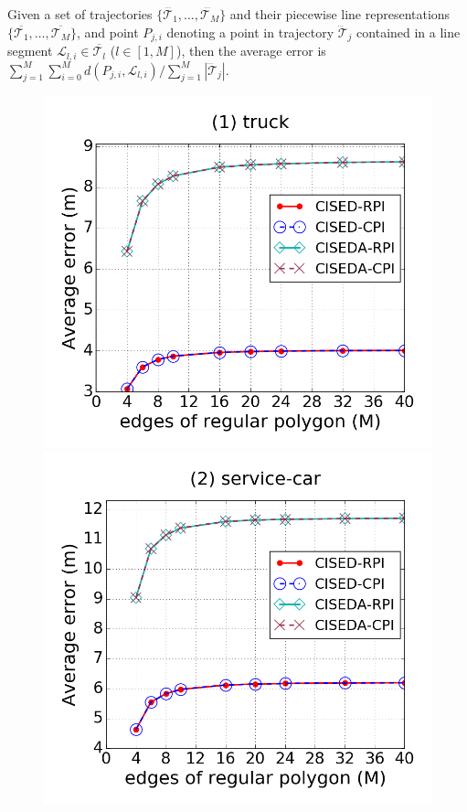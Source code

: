 Given a set of trajectories $\{\dddot{\mathcal{T}_1}, \ldots, \dddot{\mathcal{T}_M}\}$ and their piecewise line representations $\{\overline{\mathcal{T}_1}, \ldots, \overline{\mathcal{T}_M}\}$, and point $P_{j,i}$ denoting
a point in trajectory $\dddot{\mathcal{T}}_j$ contained in a line segment $\mathcal{L}_{l,i}\in\overline{\mathcal{T}_l}$ ($l\in[1,M]$),
then the average error is $\sum_{j=1}^{M}\sum_{i=0}^{M} d(P_{j,i},
\mathcal{L}_{l,i})/\sum_{j=1}^{M}{|\dddot{\mathcal{T}}_j |}$.




\begin{figure}[tb!]
\centering
\includegraphics[scale = 0.250]{figures/Exp-M-e-20-error-truck.png}
\includegraphics[scale = 0.250]{figures/Exp-M-e-20-error-service.png}

\end{figure}
